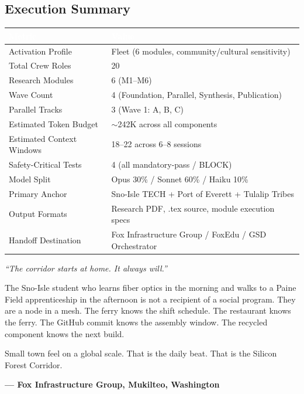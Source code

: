 \documentclass[11pt,letterpaper]{article}
\newcommand{\tableheader}[1]{\textbf{\sffamily\textcolor{white}{#1}}}
\begin{document}
\subsection{Execution Summary}

\begin{center}
\begin{tabularx}{\textwidth}{L{4cm}X}
\toprule
{}
\tableheader{Metric} & \tableheader{Value} \\
\midrule
Activation Profile & Fleet (6 modules, community/cultural sensitivity) \\
Total Crew Roles & 20 \\
Research Modules & 6 (M1--M6) \\
Wave Count & 4 (Foundation, Parallel, Synthesis, Publication) \\
Parallel Tracks & 3 (Wave 1: A, B, C) \\
Estimated Token Budget & $\sim$242K across all components \\
Estimated Context Windows & 18--22 across 6--8 sessions \\
Safety-Critical Tests & 4 (all mandatory-pass / BLOCK) \\
Model Split & Opus 30\% / Sonnet 60\% / Haiku 10\% \\
Primary Anchor & Sno-Isle TECH + Port of Everett + Tulalip Tribes \\
Output Formats & Research PDF, .tex source, module execution specs \\
Handoff Destination & Fox Infrastructure Group / FoxEdu / GSD Orchestrator \\
\bottomrule
\end{tabularx}
\end{center}

\vspace{2em}
\begin{quotebox}
\textit{``The corridor starts at home. It always will.''}

\vspace{0.8em}
The Sno-Isle student who learns fiber optics in the morning and walks to a Paine Field apprenticeship in the afternoon is not a recipient of a social program. They are a node in a mesh. The ferry knows the shift schedule. The restaurant knows the ferry. The GitHub commit knows the assembly window. The recycled component knows the next build.

\vspace{0.5em}
Small town feel on a global scale. That is the daily beat. That is the Silicon Forest Corridor.

\vspace{0.5em}
\textbf{\sffamily --- Fox Infrastructure Group, Mukilteo, Washington}
\end{quotebox}
\end{document}
